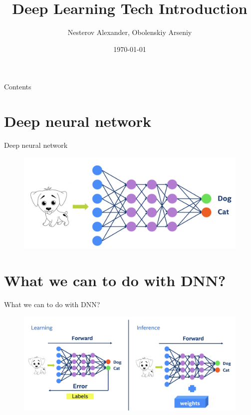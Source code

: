 \documentclass{beamer}
\title[Deep Learning Tech Introduction]{Deep Learning Tech Introduction}
\author{Nesterov Alexander, Obolenskiy Arseniy}
\institute{ITLab}
\date{\today}
\begin{document}
\begin{frame}
    \titlepage
\end{frame}

\begin{frame}{Contents}
    \tableofcontents
\end{frame}

\section{Deep neural network}

\begin{frame}{Deep neural network}
  \begin{figure}[h]
    \includegraphics[width=1\textwidth]{images/dnn.png}
  \end{figure}
\end{frame}

\section{What we can to do with DNN?}
\begin{frame}{What we can to do with DNN?}
  \begin{figure}[h]
    \includegraphics[width=1\textwidth]{images/inference.png}
  \end{figure}
\end{frame}
\end{document}
